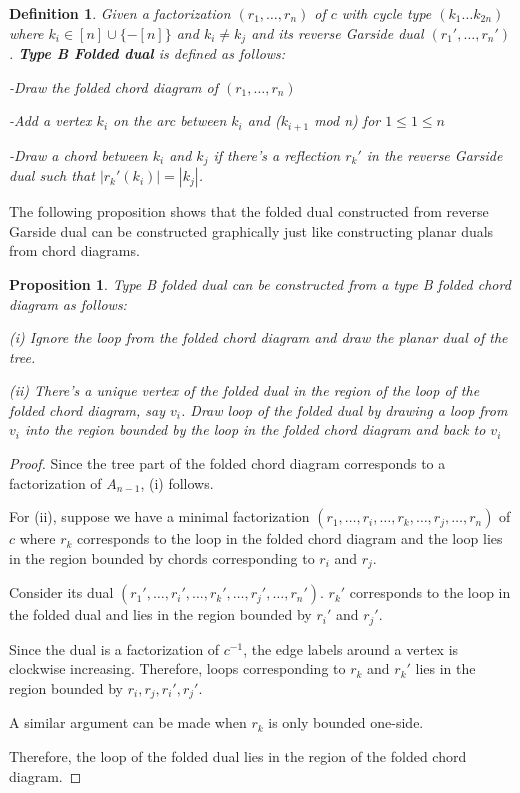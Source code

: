 \documentclass[11pt]{amsart}
\newtheorem{defi}[thm]{Definition}%
\newtheorem{prop}[thm]{Proposition}%
\begin{document}
\begin{defi}
    Given a factorization $(r_1,\dots,r_n)$ of $c$ with cycle type $(k_1 \dots k_{2n})$ where $k_i \in [n] \cup \{-[n]\}$ and $k_i \neq k_j$ and its reverse Garside dual $(r_1',\dots,r_n')$. \textbf{Type B Folded dual} is defined as follows:

    -Draw the folded chord diagram of $(r_1,\dots,r_n)$

    -Add a vertex $k_i$ on the arc between $k_i$ and ($k_{i+1}$ mod n) for $1 \leq 1 \leq n$

    -Draw a chord between $k_i$ and $k_j$ if there's a reflection $r_k'$ in the reverse Garside dual such that $|r_k'(k_i)|=|k_j|$.
\end{defi}

The following proposition shows that the folded dual constructed from reverse Garside dual can be constructed graphically just like constructing planar duals from chord diagrams.

\begin{prop}
    Type B folded dual can be constructed from a type B folded chord diagram as follows:
    
    (i) Ignore the loop from the folded chord diagram and draw the planar dual of the tree.

    (ii) There's a unique vertex of the folded dual in the region of the loop of the folded chord diagram, say $v_i$. Draw loop of the folded dual by drawing a loop from $v_i$ into the region bounded by the loop in the folded chord diagram and back to $v_i$
\end{prop}

\begin{proof}
    Since the tree part of the folded chord diagram corresponds to a factorization of $A_{n-1}$, (i) follows.

    For (ii), suppose we have a minimal factorization $(r_1, \dots,r_i,\dots,r_k, \dots, r_j, \dots, r_n)$ of $c$ where $r_k$ corresponds to the loop in the folded chord diagram and the loop lies in the region bounded by chords corresponding to $r_i$ and $r_j$.

    Consider its dual $(r_1',\dots,r_i',\dots,r_k', \dots, r_j', \dots, r_n')$. $r_k'$ corresponds to the loop in the folded dual and lies in the region bounded by $r_i'$ and $r_j'$.

    Since the dual is a factorization of $c^{-1}$, the edge labels around a vertex is clockwise increasing. Therefore, loops corresponding to $r_k$ and $r_k'$ lies in the region bounded by $r_i, r_j, r_i', r_j'$.

    A similar argument can be made when $r_k$ is only bounded one-side.

    Therefore, the loop of the folded dual lies in the region of the folded chord diagram.

\end{proof}
\end{document}
